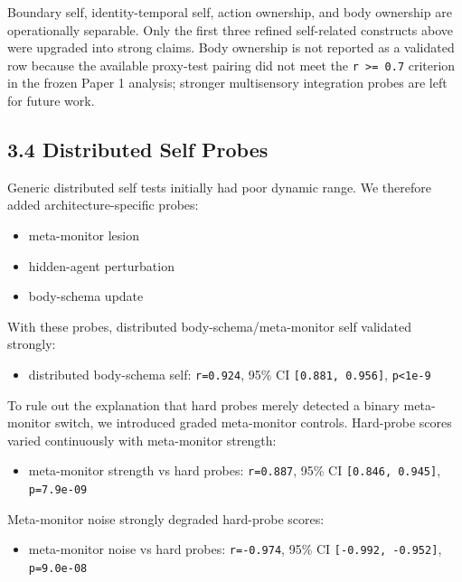 \documentclass[
  11pt,
  letterpaper,
]{article}
\providecommand{\tightlist}{%
  \setlength{\itemsep}{0pt}\setlength{\parskip}{0pt}}
\begin{document}
Boundary self, identity-temporal self, action ownership, and body
ownership are operationally separable. Only the first three refined
self-related constructs above were upgraded into strong claims. Body
ownership is not reported as a validated row because the available
proxy-test pairing did not meet the \texttt{r\ \textgreater{}=\ 0.7}
criterion in the frozen Paper 1 analysis; stronger multisensory
integration probes are left for future work.

\subsection{3.4 Distributed Self Probes}\label{distributed-self-probes}

Generic distributed self tests initially had poor dynamic range. We
therefore added architecture-specific probes:

\begin{itemize}
\tightlist
\item
  meta-monitor lesion
\item
  hidden-agent perturbation
\item
  body-schema update
\end{itemize}

With these probes, distributed body-schema/meta-monitor self validated
strongly:

\begin{itemize}
\tightlist
\item
  distributed body-schema self: \texttt{r=0.924}, 95\% CI
  \texttt{{[}0.881,\ 0.956{]}}, \texttt{p\textless{}1e-9}
\end{itemize}

To rule out the explanation that hard probes merely detected a binary
meta-monitor switch, we introduced graded meta-monitor controls.
Hard-probe scores varied continuously with meta-monitor strength:

\begin{itemize}
\tightlist
\item
  meta-monitor strength vs hard probes: \texttt{r=0.887}, 95\% CI
  \texttt{{[}0.846,\ 0.945{]}}, \texttt{p=7.9e-09}
\end{itemize}

Meta-monitor noise strongly degraded hard-probe scores:

\begin{itemize}
\tightlist
\item
  meta-monitor noise vs hard probes: \texttt{r=-0.974}, 95\% CI
  \texttt{{[}-0.992,\ -0.952{]}}, \texttt{p=9.0e-08}
\end{itemize}
\end{document}
